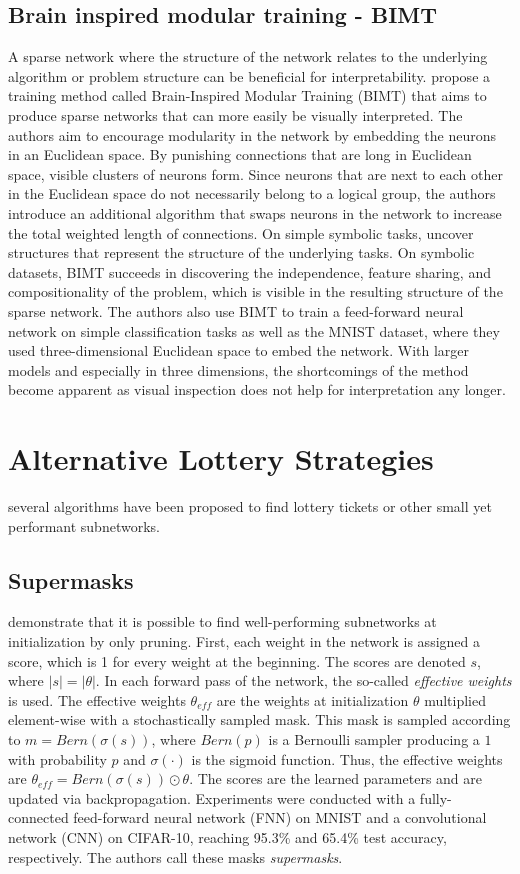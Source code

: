 \subsection{Brain inspired modular training {-} BIMT}
A sparse network where the structure of the network relates to the underlying algorithm or problem structure can be beneficial for interpretability.
\textcite{BIMT} propose a training method called Brain-Inspired Modular Training (BIMT) that aims to produce sparse networks that can more easily be visually interpreted.
The authors aim to encourage modularity in the network by embedding the neurons in an Euclidean space.
By punishing connections that are long in Euclidean space, visible clusters of neurons form. 
Since neurons that are next to each other in the Euclidean space do not necessarily belong to a logical group, the authors introduce an additional algorithm that swaps neurons in the network to increase the total weighted length of connections.
On simple symbolic tasks, \autocite{BIMT} uncover structures that represent the structure of the underlying tasks.
On symbolic datasets, BIMT succeeds in discovering the independence, feature sharing, and compositionality of the problem, which is visible in the resulting structure of the sparse network.
The authors also use BIMT to train a feed-forward neural network on simple classification tasks as well as the MNIST dataset, where they used three-dimensional Euclidean space to embed the network.
With larger models and especially in three dimensions, the shortcomings of the method become apparent as visual inspection does not help for interpretation any longer.

\section{Alternative Lottery Strategies}
several algorithms have been proposed to find lottery tickets or other small yet performant subnetworks.
\subsection{Supermasks}
\textcite{Supermasks} demonstrate that it is possible to find well-performing subnetworks at initialization by only pruning.
First, each weight in the network is assigned a score, which is 1 for every weight at the beginning. 
The scores are denoted $s$, where $|s| = |\theta|$.
In each forward pass of the network, the so-called \textit{effective weights} is used.
The effective weights $\theta_{eff}$ are the weights at initialization $\theta$ multiplied element-wise with a stochastically sampled mask.
This mask is sampled according to $m = \textit{Bern}(\sigma(s))$, where $\textit{Bern}(p)$ is a Bernoulli sampler producing a $1$ with probability $p$ and $\sigma(\cdot)$ is the sigmoid function. 
Thus, the effective weights are $\theta_{eff} = \textit{Bern}(\sigma(s)) \odot \theta$.
The scores are the learned parameters and are updated via backpropagation.
Experiments were conducted with a fully-connected feed-forward neural network (FNN) on MNIST and a convolutional network (CNN) on CIFAR-10, reaching 95.3\% and 65.4\% test accuracy, respectively.
The authors call these masks \textit{supermasks}.

